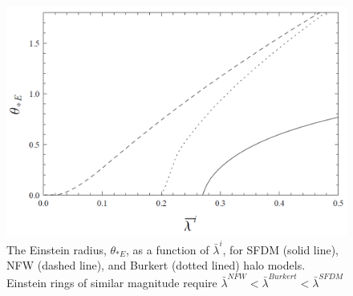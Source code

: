 \documentclass[9.5pt, twocolumn]{article}
\begin{document}
\begin{figure}
    \includegraphics[scale=0.3]{Grafica2.png}
    \caption{The Einstein radius, $\theta_{*E}$, as a function of $\bar{\lambda}^i$, for SFDM (solid line), NFW (dashed line), and Burkert (dotted lined) halo models. Einstein rings of similar magnitude require $\bar{\lambda}^{NFW}<\bar{\lambda}^{Burkert}<\bar{\lambda}^{SFDM}$}
    \label{fig:Grafica2}
\end{figure}
\end{document}
